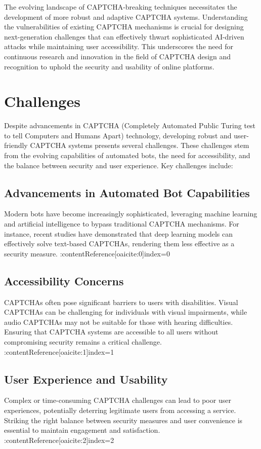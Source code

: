\documentclass[sigconf]{acmart}
\begin{document}
The evolving landscape of CAPTCHA-breaking techniques necessitates the development of more robust and adaptive CAPTCHA systems. Understanding the vulnerabilities of existing CAPTCHA mechanisms is crucial for designing next-generation challenges that can effectively thwart sophisticated AI-driven attacks while maintaining user accessibility. This underscores the need for continuous research and innovation in the field of CAPTCHA design and recognition to uphold the security and usability of online platforms.

\section{Challenges}
Despite advancements in CAPTCHA (Completely Automated Public Turing test to tell Computers and Humans Apart) technology, developing robust and user-friendly CAPTCHA systems presents several challenges. These challenges stem from the evolving capabilities of automated bots, the need for accessibility, and the balance between security and user experience. Key challenges include:

\subsection{Advancements in Automated Bot Capabilities}
Modern bots have become increasingly sophisticated, leveraging machine learning and artificial intelligence to bypass traditional CAPTCHA mechanisms. For instance, recent studies have demonstrated that deep learning models can effectively solve text-based CAPTCHAs, rendering them less effective as a security measure. :contentReference[oaicite:0]{index=0}

\subsection{Accessibility Concerns}
CAPTCHAs often pose significant barriers to users with disabilities. Visual CAPTCHAs can be challenging for individuals with visual impairments, while audio CAPTCHAs may not be suitable for those with hearing difficulties. Ensuring that CAPTCHA systems are accessible to all users without compromising security remains a critical challenge. :contentReference[oaicite:1]{index=1}

\subsection{User Experience and Usability}
Complex or time-consuming CAPTCHA challenges can lead to poor user experiences, potentially deterring legitimate users from accessing a service. Striking the right balance between security measures and user convenience is essential to maintain engagement and satisfaction. :contentReference[oaicite:2]{index=2}
\end{document}
